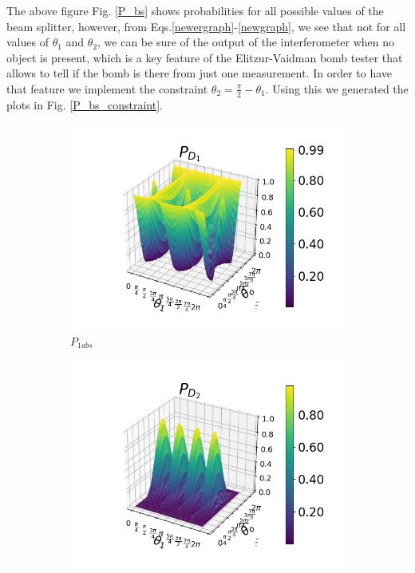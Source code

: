 \documentclass[12pt]{book}
\begin{document}
The above figure Fig. \ref{P_bs} shows probabilities for all possible values of the beam splitter, however, from Eqs.\ref{newergraph}-\ref{newgraph}, we see that not for all values of $\theta_{1}$ and $\theta_{2}$, we can be sure of the output of the interferometer when no object is present, which is a key feature of the Elitzur-Vaidman bomb tester that allows to tell if the bomb is there from just one measurement. In order to have that feature we implement the constraint $\theta_{2}=\frac{\pi}{2}-\theta_{1}$. Using this we generated the plots in Fig. \ref{P_bs_constraint}.
\begin{figure}[t!]
\centering
\begin{subfigure}[b]{0.45\linewidth}
\includegraphics[width=\linewidth]{images/PD1_BS_h.png}
\caption{$P_{1abs}$}
\label{fig:BS1}
\end{subfigure}
\begin{subfigure}[b]{0.45\linewidth}
\includegraphics[width=\linewidth]{images/PD2_BS_h.png}

\end{subfigure}
\end{figure}
\end{document}
